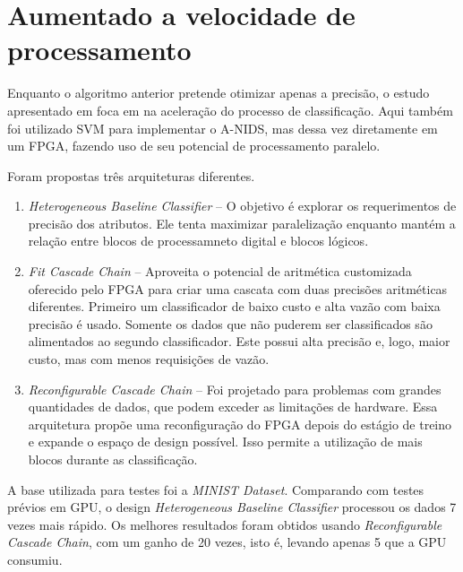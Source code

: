 
\section{Aumentado a velocidade de processamento}
Enquanto o algoritmo anterior pretende otimizar apenas a precisão, o estudo apresentado em \cite{papadonikolakis12}
foca em na aceleração do processo de classificação. Aqui também foi utilizado SVM para implementar o A-NIDS, mas dessa
vez diretamente em um FPGA, fazendo uso de seu potencial de processamento paralelo.
\par Foram propostas três arquiteturas diferentes.
\begin{enumerate}
    \item \textit{Heterogeneous Baseline Classifier} -- O objetivo é explorar os requerimentos de precisão dos atributos. Ele
    tenta maximizar paralelização enquanto mantém a relação entre blocos de processamneto digital e blocos lógicos.
    \item \textit{Fit Cascade Chain} -- Aproveita o potencial de aritmética customizada oferecido pelo FPGA para criar uma
    cascata com duas precisões aritméticas diferentes. Primeiro um classificador de baixo custo e alta vazão com baixa
    precisão é usado. Somente os dados que não puderem ser classificados são alimentados ao segundo classificador. Este
    possui alta precisão e, logo, maior custo, mas com menos requisições de vazão.
    \item \textit{Reconfigurable Cascade Chain} -- Foi projetado para problemas com grandes quantidades de dados, que podem
    exceder as limitações de hardware. Essa arquitetura propõe uma reconfiguração do FPGA depois do estágio de treino e
    expande o espaço de design possível. Isso permite a utilização de mais blocos durante as classificação.
\end{enumerate}
\par A base utilizada para testes foi a \textit{MINIST Dataset}. Comparando com testes prévios em GPU, o design
\textit{Heterogeneous Baseline Classifier} processou os dados 7 vezes mais rápido. Os melhores resultados foram
obtidos usando \textit{Reconfigurable Cascade Chain}, com um ganho de 20 vezes, isto é, levando apenas 5%
que a GPU consumiu.